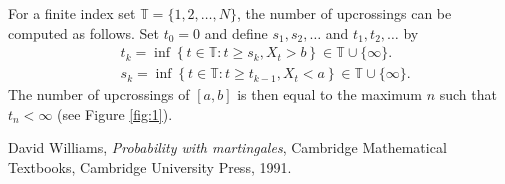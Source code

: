 \documentclass[12pt]{article}
\begin{document}
For a finite index set $\mathbb{T}=\{1,2,\ldots,N\}$, the number of upcrossings can be computed as follows. Set $t_0=0$ and define $s_1,s_2,\ldots$ and $t_1,t_2,\ldots$ by
\begin{align*}
&t_k=\inf\left\{t\in\mathbb{T}\colon t\ge s_k, X_t>b\right\}\in\mathbb{T}\cup\{\infty\}.\\
&s_k=\inf\left\{t\in\mathbb{T}\colon t\ge t_{k-1}, X_t<a\right\}\in\mathbb{T}\cup\{\infty\}.
\end{align*}
The number of upcrossings of $[a,b]$ is then equal to the maximum $n$ such that $t_n<\infty$ (see Figure \ref{fig:1}).

\begin{thebibliography}{9}
David Williams, \emph{Probability with martingales},
Cambridge Mathematical Textbooks, Cambridge University Press, 1991.
\end{thebibliography}

\end{document}
